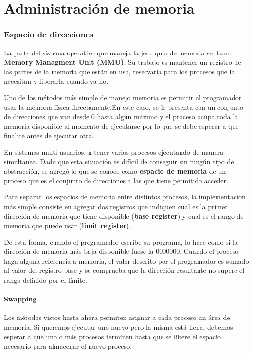 \part{Administración de memoria}
\section{Espacio de direcciones}
La parte del sistema operativo que maneja la jerarquía de memoria se llama \textbf{Memory Managment Unit (MMU)}. Su trabajo es mantener un registro de las partes de la memoria que están en uso, reservarla para los procesos que la necesitan y liberarla cuando ya no.

Uno de los métodos más simple de manejo memoria es permitir al programador usar la memoria física directamente.En este caso, se le presenta con un conjunto de direcciones que van desde 0 hasta algún máximo y el proceso ocupa toda la memoria disponible al momento de ejecutarse por lo que se debe esperar a que finalice antes de ejecutar otro.

En sistemas multi-usuarios, n tener varios procesos ejecutando de manera simultanea. Dado que esta situación es difícil de conseguir sin ningún tipo de abstracción, se agregó lo que se conoce como \textbf{espacio de memoria} de un proceso que es el conjunto de direcciones a las que tiene permitido acceder. 

Para separar los espacios de memoria entre distintos procesos, la implementación más simple consiste en agregar dos registros que indiquen cual es la primer dirección de memoria que tiene disponible (\textbf{base register}) y cual es el rango de memoria que puede usar (\textbf{limit register}). 

De esta forma, cuando el programador escribe su programa,  lo hace como si la dirección de memoria más baja disponible fuese la $0000000$. Cuando el proceso haga alguna referencia a memoria, el valor descrito por el programador es sumado al valor del registro base y se comprueba que la dirección resultante no supere el rango definido por el límite.

\subsection{Swapping}
Los métodos vistos hasta ahora permiten asignar a cada proceso un área de memoria. Si queremos ejecutar uno nuevo pero la misma está llena, debemos esperar a que uno o más procesos terminen hasta que se libere el espacio necesario para almacenar el nuevo proceso.

